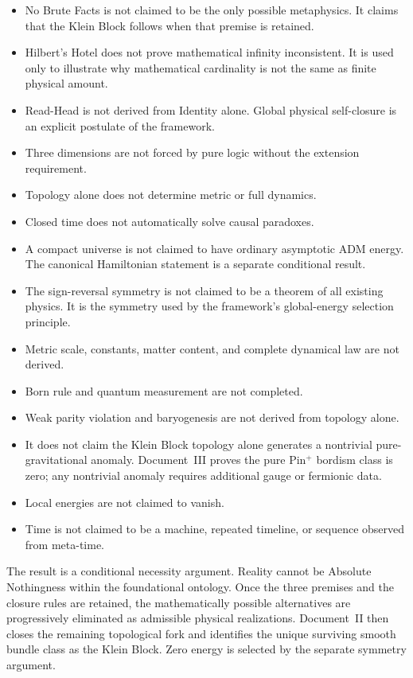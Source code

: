 \documentclass[11pt]{article}
\theoremstyle{canonstyle}
\begin{document}
\begin{itemize}
    \item No Brute Facts is not claimed to be the only possible metaphysics. It claims that the Klein Block follows when that premise is retained.
    \item Hilbert's Hotel does not prove mathematical infinity inconsistent. It is used only to illustrate why mathematical cardinality is not the same as finite physical amount.
    \item Read-Head is not derived from Identity alone. Global physical self-closure is an explicit postulate of the framework.
    \item Three dimensions are not forced by pure logic without the extension requirement.
    \item Topology alone does not determine metric or full dynamics.
    \item Closed time does not automatically solve causal paradoxes.
    \item A compact universe is not claimed to have ordinary asymptotic ADM energy. The canonical Hamiltonian statement is a separate conditional result.
    \item The sign-reversal symmetry is not claimed to be a theorem of all existing physics. It is the symmetry used by the framework's global-energy selection principle.
    \item Metric scale, constants, matter content, and complete dynamical law are not derived.
    \item Born rule and quantum measurement are not completed.
    \item Weak parity violation and baryogenesis are not derived from topology alone.
    \item It does not claim the Klein Block topology alone generates a nontrivial pure-gravitational anomaly. Document~III proves the pure Pin$^+$ bordism class is zero; any nontrivial anomaly requires additional gauge or fermionic data.
    \item Local energies are not claimed to vanish.
    \item Time is not claimed to be a machine, repeated timeline, or sequence observed from meta-time.
\end{itemize}

\begin{plainwords}
The result is a conditional necessity argument. Reality cannot be Absolute Nothingness within the foundational ontology. Once the three premises and the closure rules are retained, the mathematically possible alternatives are progressively eliminated as admissible physical realizations. Document~II then closes the remaining topological fork and identifies the unique surviving smooth bundle class as the Klein Block. Zero energy is selected by the separate symmetry argument.
\end{plainwords}
\end{document}
